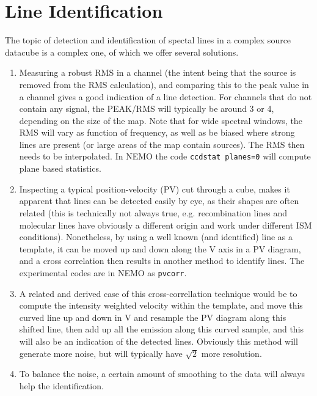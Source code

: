 \documentclass[preprint]{aastex} %
\begin{document}
\section{Line Identification}


The topic of detection and identification of spectal
lines in a complex source datacube is a complex one,
of which we offer several solutions. 

\begin{enumerate}

\item
Measuring a robust RMS in a channel (the intent being that the source is removed from the 
RMS calculation), and comparing this to the peak value in a channel gives a good 
indication of a line detection. For channels that do not contain any signal, 
the PEAK/RMS will typically be around 3 or 4, depending on the size of the map.
Note that for wide spectral windows, the RMS will vary as function of frequency,
as well as be biased where strong lines are present (or large areas of the map
contain sources). The RMS then needs to be interpolated. In NEMO the code
{\tt ccdstat planes=0} will compute plane based statistics.

\item
Inspecting a typical position-velocity (PV) cut through a cube, makes it apparent
that lines can be detected easily by eye, as their shapes are often related
(this is technically not always true, e.g. recombination lines and molecular lines have
obviously a different origin and work under different ISM conditions). Nonetheless,
by using a well known (and identified) line as a template, it can be moved up and down
along the V axis in a PV diagram, and a cross correlation then results in another method
to identify lines. The experimental codes are in NEMO as {\tt pvcorr}.


\item
A related and derived case of this
cross-correllation technique would be to compute the intensity
weighted velocity within the template, and move this curved line up and down in V and resample
the PV diagram along this shifted line, then add up all the emission along this curved
sample, and this will also be an indication of the detected lines.  Obviously this
method will generate more noise, but will typically have $\sqrt{2}$ more resolution.

\item
To balance the noise, a certain amount of smoothing to the data will always help
the identification.


\end{enumerate}
\end{document}
